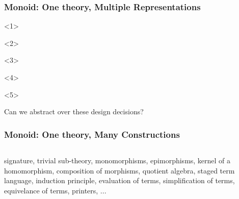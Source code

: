 \documentclass[t,10pt,numbers,fleqn,usenames,xcolor=dvipsnames]{beamer}
\begin{document}
\begin{frame}[fragile]
\frametitle{Monoid: One theory, Multiple Representations} 
\begin{onlyenv}<1>
\begin{figure}
  \scalebox{.95}{}
\end{figure}
\end{onlyenv}
\begin{onlyenv}<2>
\begin{figure}
  \scalebox{.95}{}
\end{figure}
\end{onlyenv}
\begin{onlyenv}<3>
\begin{figure}
  \scalebox{.95}{}
\end{figure}
\end{onlyenv}
\begin{onlyenv}<4>
\begin{figure}
  \scalebox{.95}{}
\end{figure}
\end{onlyenv}
\begin{onlyenv}<5>
\begin{figure}
  \scalebox{.95}{}
\end{figure}
\pause
\scriptsize{Can we abstract over these design decisions?} 
\end{onlyenv}
\end{frame}

\begin{frame}[fragile] 
\frametitle{Monoid: One theory, Many Constructions} 
\begin{columns}
    \begin{column}{0.45\textwidth}
 
     \end{column}
     \begin{column}{0.45\textwidth} 
 
     \end{column}  
\end{columns}
\vspace{0.3cm}      
\scriptsize
signature, trivial sub-theory, monomorphisms, epimorphisms, kernel of a homomorphism, composition of morphisms, quotient algebra, staged term language, induction principle, evaluation of terms, simplification of terms, equivelance of terms, printers, ... 
\end{frame}
\end{document}
